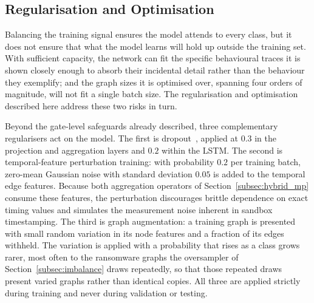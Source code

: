 \documentclass[%
    BCOR=10mm,
    DIV=13,
    toc=bibliography,
    toc=listof,
    oneside,
    12pt,
]{scrbook}
\begin{document}
\subsection{Regularisation and Optimisation}
\label{subsec:regularisation}
\label{subsec:optimisation}

Balancing the training signal ensures the model attends to every class, but it
does not ensure that what the model learns will hold up outside the training set.
With sufficient capacity, the network can fit the specific behavioural traces it
is shown closely enough to absorb their incidental detail rather than the
behaviour they exemplify; and the graph sizes it is optimised over, spanning
four orders of magnitude, will not fit a single batch size. The
regularisation and optimisation described here address these two risks in turn.

Beyond the gate-level safeguards already described, three complementary
regularisers act on the model. The first is
dropout~\cite{srivastava2014dropout}, applied at $0.3$ in the projection and
aggregation layers and $0.2$ within the LSTM. The second is temporal-feature
perturbation training: with probability $0.2$ per training batch, zero-mean
Gaussian noise with standard deviation $0.05$ is added to the temporal edge
features. Because both aggregation operators of Section~\ref{subsec:hybrid_mp}
consume these features, the perturbation discourages brittle dependence on
exact timing values and simulates the measurement noise inherent in sandbox
timestamping. The third is graph augmentation: a training graph is presented
with small random variation in its node features and a fraction of its edges
withheld. The variation is applied with a probability that rises as a class
grows rarer, most often to the ransomware graphs the oversampler of
Section~\ref{subsec:imbalance} draws repeatedly, so that those repeated draws
present varied graphs rather than identical copies. All three are applied
strictly during training and never during validation or testing.
\end{document}
